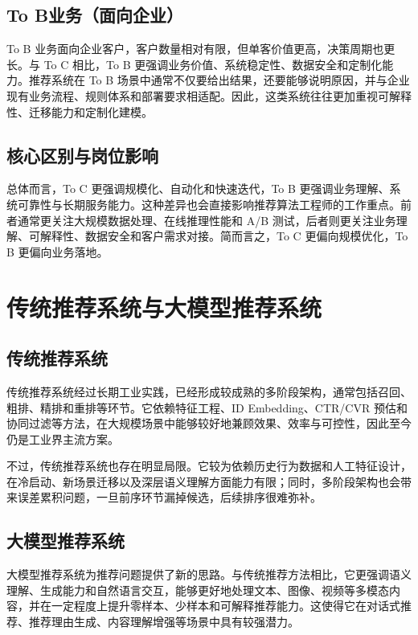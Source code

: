 \documentclass[UTF8]{ctexart}
\begin{document}
\subsection{To B业务（面向企业）}

To B 业务面向企业客户，客户数量相对有限，但单客价值更高，决策周期也更长。与 To C 相比，To B 更强调业务价值、系统稳定性、数据安全和定制化能力。推荐系统在 To B 场景中通常不仅要给出结果，还要能够说明原因，并与企业现有业务流程、规则体系和部署要求相适配。因此，这类系统往往更加重视可解释性、迁移能力和定制化建模。

\subsection{核心区别与岗位影响}

总体而言，To C 更强调规模化、自动化和快速迭代，To B 更强调业务理解、系统可靠性与长期服务能力。这种差异也会直接影响推荐算法工程师的工作重点。前者通常更关注大规模数据处理、在线推理性能和 A/B 测试，后者则更关注业务理解、可解释性、数据安全和客户需求对接。简而言之，To C 更偏向规模优化，To B 更偏向业务落地。

\section{传统推荐系统与大模型推荐系统}

\subsection{传统推荐系统}

传统推荐系统经过长期工业实践，已经形成较成熟的多阶段架构，通常包括召回、粗排、精排和重排等环节。它依赖特征工程、ID Embedding、CTR/CVR 预估和协同过滤等方法，在大规模场景中能够较好地兼顾效果、效率与可控性，因此至今仍是工业界主流方案。

不过，传统推荐系统也存在明显局限。它较为依赖历史行为数据和人工特征设计，在冷启动、新场景迁移以及深层语义理解方面能力有限；同时，多阶段架构也会带来误差累积问题，一旦前序环节漏掉候选，后续排序很难弥补。

\subsection{大模型推荐系统}

大模型推荐系统为推荐问题提供了新的思路。与传统推荐方法相比，它更强调语义理解、生成能力和自然语言交互，能够更好地处理文本、图像、视频等多模态内容，并在一定程度上提升零样本、少样本和可解释推荐能力。这使得它在对话式推荐、推荐理由生成、内容理解增强等场景中具有较强潜力。
\end{document}
